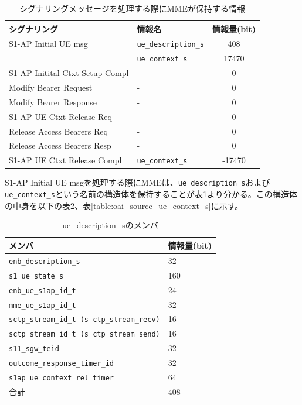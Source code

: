 \documentclass[a4j]{ujarticle}
\begin{document}
\begin{table}[htbp]
  \centering
  \caption{シグナリングメッセージを処理する際にMMEが保持する情報}
  \label{table:oai_source_memory}
  \begin{tabular}{l|l|c}
    \hline
    シグナリング  & 情報名 & 情報量(bit)  \\ \hline \hline
    S1-AP Initial UE msg & \verb|ue_description_s| & 408 \\
    & \verb|ue_context_s| & 17470\\\hline
    S1-AP Initital Ctxt Setup Compl & - & 0 \\\hline
    Modify Bearer Request & - & 0 \\\hline
    Modify Bearer Response & - & 0 \\\hline
    S1-AP UE Ctxt Release Req & - & 0 \\\hline
    Release Access Bearers Req & - & 0 \\\hline
    Release Access Bearers Resp & - & 0 \\\hline
    S1-AP UE Ctxt Release Compl & \verb|ue_context_s| & -17470 \\\hline

  \end{tabular}
\end{table}

S1-AP Initial UE msgを処理する際にMMEは、\verb|ue_description_s|および\verb|ue_context_s|という名前の構造体を保持することが表\ref{table:oai_source_memory}より分かる。この構造体の中身を以下の表\ref{table:oai_source_memory_ue_description_s}、表\ref{table:oai_source_ue_context_s}に示す。
\begin{table}[htbp]
  \centering
  \caption{ue\_description\_sのメンバ}
  \label{table:oai_source_memory_ue_description_s}
  \begin{tabular}{l|l}
    \hline
    メンバ & 情報量(bit) \\ \hline \hline
    \verb|enb_description_s| & 32\\
    \verb|s1_ue_state_s| & 160\\
    \verb|enb_ue_s1ap_id_t|  & 24\\
    \verb|mme_ue_s1ap_id_t| & 32\\
    \verb|sctp_stream_id_t (s ctp_stream_recv)| & 16\\
    \verb|sctp_stream_id_t (s ctp_stream_send)| & 16\\
    \verb|s11_sgw_teid| & 32\\
    \verb|outcome_response_timer_id| & 32\\
    \verb|s1ap_ue_context_rel_timer| & 64\\\hline
    合計  & 408\\\hline
  \end{tabular}
\end{table}
\end{document}
